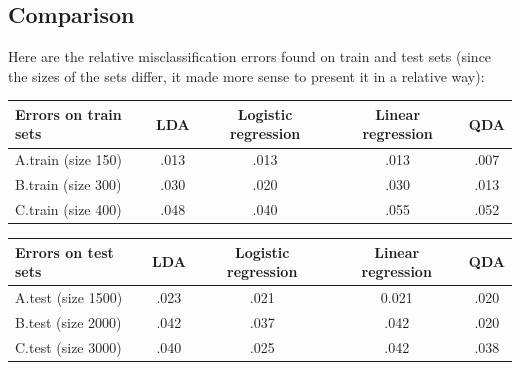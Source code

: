 \documentclass[11pt,a4paper]{article}
\begin{document}
\subsection{Comparison}
%
\hspace*{-6mm}Here are the relative misclassification errors found on train and test sets (since the sizes of the sets differ, it made more sense to present it in a relative way):
\\[5mm]
\begin{tabular}{|l|c|c|c|c|}
  \hline
  Errors on train sets & LDA & Logistic regression & Linear regression & QDA \\
  \hline
  A.train (size 150) & .013 & .013 & .013 & .007 \\
  B.train (size 300) & .030 & .020 & .030 & .013 \\
  C.train (size 400) & .048 & .040 & .055 & .052 \\
  \hline
\end{tabular}
%
\begin{tabular}{|l|c|c|c|c|}
  \hline
  Errors on test sets & LDA & Logistic regression & Linear regression & QDA \\
  \hline
  A.test (size 1500) & .023 & .021 & 0.021 & .020 \\
  B.test (size 2000) & .042 & .037 & .042 & .020 \\
  C.test (size 3000) & .040 & .025 & .042 & .038 \\
  \hline
\end{tabular}
\end{document}
